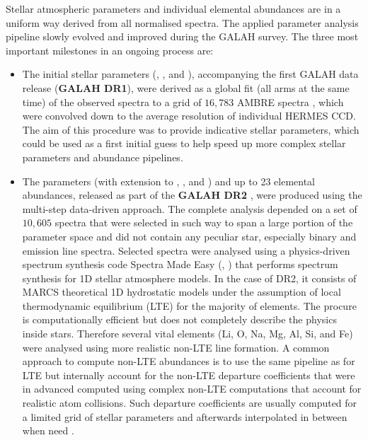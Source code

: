 Stellar atmospheric parameters and individual elemental abundances are in a uniform way derived from all normalised spectra. The applied parameter analysis pipeline slowly evolved and improved during the GALAH survey. The three most important milestones in an ongoing process are:

\begin{itemize}
	\item The initial stellar parameters (\Teff, \Logg, and \Feh), accompanying the first GALAH data release (\textbf{GALAH DR1}), were derived as a global fit (all arms at the same time) of the observed spectra to a grid of $16,783$ AMBRE spectra \cite{2012A&A...544A.126D}, which were convolved down to the average resolution of individual HERMES CCD. The aim of this procedure was to provide indicative stellar parameters, which could be used as a first initial guess to help speed up more complex stellar parameters and abundance pipelines.
	
	\item The parameters (with extension to \vsin, \vmic, and \aks) and up to 23 elemental abundances, released as part of the \textbf{GALAH DR2} \cite{buder2018}, were produced using the multi-step data-driven approach. The complete analysis depended on a set of $10,605$ spectra that were selected in such way to span a large portion of the parameter space and did not contain any peculiar star, especially binary and emission line spectra. Selected spectra were analysed using a physics-driven spectrum synthesis code Spectra Made Easy (\SM, \cite{1996A&AS..118..595V, 2017A&A...597A..16P}) that performs spectrum synthesis for 1D stellar atmosphere models. In the case of DR2, it consists of MARCS theoretical 1D hydrostatic models \cite{2008A&A...486..951G} under the assumption of local thermodynamic equilibrium (LTE) for the majority of elements. The procure is computationally efficient but does not completely describe the physics inside stars. Therefore several vital elements (Li, O, Na, Mg, Al, Si, and Fe) were analysed using more realistic non-LTE line formation. A common approach to compute non-LTE abundances is to use the same pipeline as for LTE but internally account for the non-LTE departure coefficients that were in advanced computed using complex non-LTE computations that account for realistic atom collisions. Such departure coefficients are usually computed for a limited grid of stellar parameters and afterwards interpolated in between when need \cite{2020A&A...637A..80O, 2019A&A...630A.104A, 2020amarsigalah}.
	

\end{itemize}
